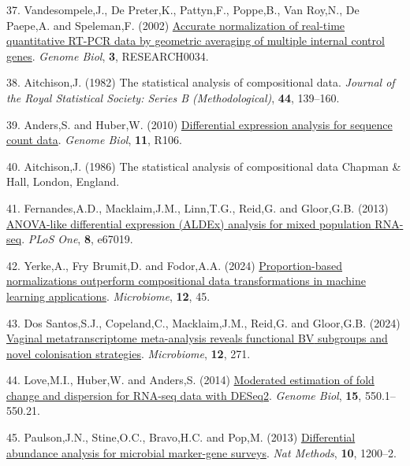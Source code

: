 \documentclass[
]{article}
\newlength{\cslhangindent}
\newenvironment{CSLReferences}[2] %
 {\begin{list}{}{%
  \setlength{\itemindent}{0pt}
  \setlength{\leftmargin}{0pt}
  \setlength{\parsep}{0pt}
  \ifodd #1
   \setlength{\leftmargin}{\cslhangindent}
   \setlength{\itemindent}{-1\cslhangindent}
  \fi
  \setlength{\itemsep}{#2\baselineskip}}}
 {\end{list}}
\begin{document}
\begin{CSLReferences}{1}{1}
37. Vandesompele,J., De Preter,K., Pattyn,F., Poppe,B., Van Roy,N., De
Paepe,A. and Speleman,F. (2002)
\href{https://www.ncbi.nlm.nih.gov/pubmed/12184808}{Accurate
normalization of real-time quantitative RT-PCR data by geometric
averaging of multiple internal control genes}. \emph{Genome Biol},
\textbf{3}, RESEARCH0034.

38. Aitchison,J. (1982) The statistical analysis of compositional data.
\emph{Journal of the Royal Statistical Society: Series B
(Methodological)}, \textbf{44}, 139--160.

39. Anders,S. and Huber,W. (2010)
\href{https://doi.org/10.1186/gb-2010-11-10-r106}{Differential
expression analysis for sequence count data}. \emph{Genome Biol},
\textbf{11}, R106.

40. Aitchison,J. (1986) The statistical analysis of compositional data
Chapman \& Hall, London, England.

41. Fernandes,A.D., Macklaim,J.M., Linn,T.G., Reid,G. and Gloor,G.B.
(2013) \href{https://doi.org/10.1371/journal.pone.0067019}{{ANOVA}-like
differential expression (ALDEx) analysis for mixed population
{RNA}-seq}. \emph{PLoS One}, \textbf{8}, e67019.

42. Yerke,A., Fry Brumit,D. and Fodor,A.A. (2024)
\href{https://doi.org/10.1186/s40168-023-01747-z}{Proportion-based
normalizations outperform compositional data transformations in machine
learning applications}. \emph{Microbiome}, \textbf{12}, 45.

43. Dos Santos,S.J., Copeland,C., Macklaim,J.M., Reid,G. and Gloor,G.B.
(2024) \href{https://doi.org/10.1186/s40168-024-01992-w}{Vaginal
metatranscriptome meta-analysis reveals functional {BV} subgroups and
novel colonisation strategies}. \emph{Microbiome}, \textbf{12}, 271.

44. Love,M.I., Huber,W. and Anders,S. (2014)
\href{https://doi.org/10.1186/s13059-014-0550-8}{Moderated estimation of
fold change and dispersion for RNA-seq data with DESeq2}. \emph{Genome
Biol}, \textbf{15}, 550.1--550.21.

45. Paulson,J.N., Stine,O.C., Bravo,H.C. and Pop,M. (2013)
\href{https://doi.org/10.1038/nmeth.2658}{Differential abundance
analysis for microbial marker-gene surveys}. \emph{Nat Methods},
\textbf{10}, 1200--2.


\end{CSLReferences}
\end{document}
